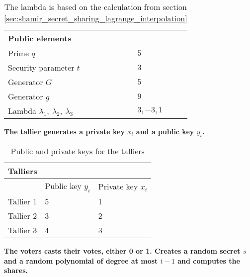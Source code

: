 \begin{table}[H]
\centering
\begin{tabular}{|l|l|}
\hline
\multicolumn{2}{|l|}{\textbf{Public elements}} \\ \hline
Prime $q$                       & $5$              \\ \hline
Security parameter $t$          & $3$              \\ \hline
Generator $G$                   & $5$              \\ \hline
Generator $g$                   & $9$              \\ \hline
Lambda  $\lambda_1, \ \lambda_2,\ \lambda_3$                      & $3,-3,1$         \\ \hline
\end{tabular}
\caption{The lambda is based on the calculation from section \ref{sec:shamir_secret_sharing_lagrange_interpolation} }
\label{my-label}
\end{table}

\noindent
\textbf{The tallier generates a private key $x_i$ and a public key $y_i$.}

\begin{table}[H]
\centering
\begin{tabular}{|l|l|l|}
\hline
\multicolumn{3}{|l|}{\textbf{Talliers}}        \\ \hline
\textbf{} & Public key $y_i$ & Private key $x_i$ \\ \hline
Tallier 1 & 5               & 1                \\ \hline
Tallier 2 & 3               & 2                \\ \hline
Tallier 3 & 4               & 3                \\ \hline
\end{tabular}
\caption{Public and private keys for the talliers}
\label{my-label}
\end{table}

\noindent
\textbf{The voters casts their votes, either 0 or 1. Creates a random secret $s$ and a random polynomial of degree at most $t-1$ and computes the shares.}

